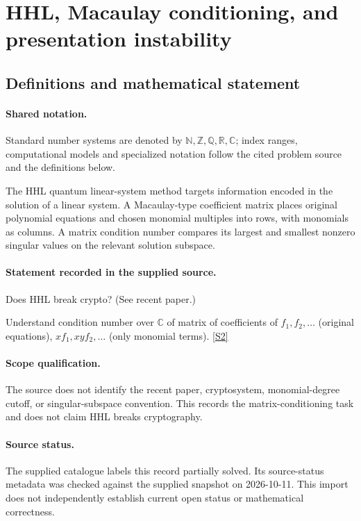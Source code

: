 \documentclass[11pt]{article}
\newcommand{\sref}[2]{\hyperlink{source:#1:#2}{[S#2]}}
\begin{document}
\section{HHL, Macaulay conditioning, and presentation instability}\label{statement}

\subsection{Definitions and mathematical statement}

\paragraph{Shared notation.}Standard number systems are denoted by $\mathbb N,\mathbb Z,\mathbb Q,\mathbb R,\mathbb C$; index ranges, computational models and specialized notation follow the cited problem source and the definitions below.


The HHL quantum linear-system method targets information encoded in the solution of a linear system. A Macaulay-type coefficient matrix places original polynomial equations and chosen monomial multiples into rows, with monomials as columns. A matrix condition number compares its largest and smallest nonzero singular values on the relevant solution subspace.
\paragraph{Statement recorded in the supplied source.}
Does HHL break crypto? (See recent paper.)

Understand condition number over $\mathbb C$ of matrix of coefficients of $f_1, f_2, \dots$ (original equations), $xf_1, xyf_2, \dots$ (only monomial terms). \sref{statement}{2}
\paragraph{Scope qualification.}
The source does not identify the recent paper, cryptosystem, monomial-degree cutoff, or singular-subspace convention. This records the matrix-conditioning task and does not claim HHL breaks cryptography.
\paragraph{Source status.}
The supplied catalogue labels this record partially solved. Its source-status metadata was checked against the supplied snapshot on 2026-10-11. This import does not independently establish current open status or mathematical correctness.
\end{document}

